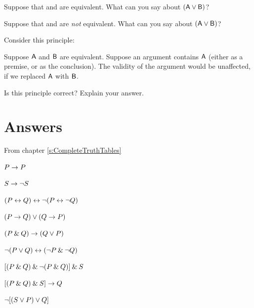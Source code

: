 \begin{small}
\begin{earg}
\item Suppose that  and  are equivalent. What can you say about $(\mathsf{A}\vee\mathsf{B})$?

\item Suppose that  and  are \emph{not} equivalent. What can you say about $(\mathsf{A}\vee\mathsf{B})$?

\item Consider this principle:
	\begin{ebullet}
		\item[] Suppose $\mathsf{A}$ and $\mathsf{B}$ are equivalent. Suppose an argument contains $\mathsf{A}$ (either as a premise, or as the conclusion). The validity of the argument would be unaffected, if we replaced $\mathsf{A}$ with $\mathsf{B}$.
	\end{ebullet}
Is this principle correct? Explain your answer.
\end{earg}





\newpage

\section{Answers}
\setcounter{ProbPart}{0}

\problempart
From chapter \ref{s:CompleteTruthTables}
\begin{earg}
\item $P \rightarrow P$ \hfill {}
\item $S \rightarrow{\neg} S$ \hfill {}
\item $(P \leftrightarrow Q) \leftrightarrow {\neg}(P\leftrightarrow {\neg} Q)$  \hfill {}
\item $(P \rightarrow Q) \vee (Q \rightarrow P)$  \hfill {}
\item $(P \mathbin{\&} Q) \rightarrow (Q \vee P)$  \hfill {}
\item ${\neg}(P \vee Q) \leftrightarrow ({\neg} P \mathbin{\&} {\neg} Q)$ \hfill {}
\item $[(P\mathbin{\&} Q) \mathbin{\&}{\neg}(P\mathbin{\&} Q)] \mathbin{\&} S$  \hfill {}
\item $[(P \mathbin{\&} Q) \mathbin{\&} S] \rightarrow Q$  \hfill {}
\item ${\neg}[(S\vee P) \vee Q]$  \hfill {}
\end{earg}
\bigskip


\end{small}

